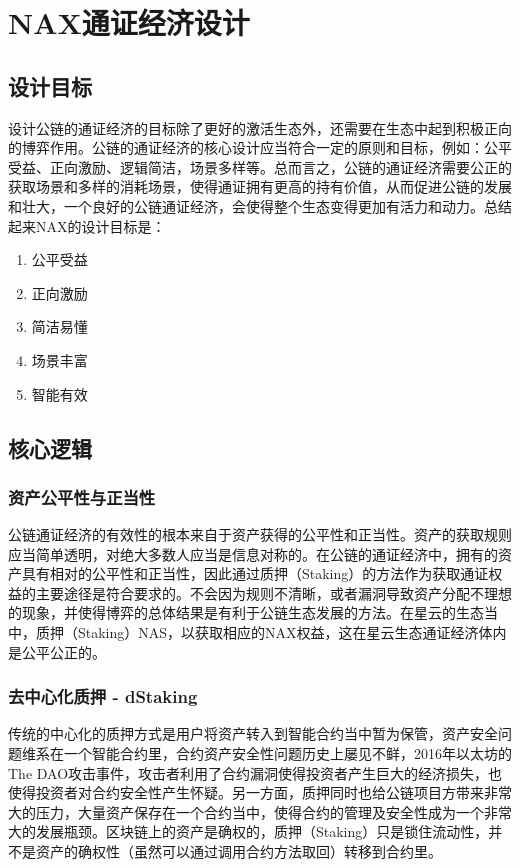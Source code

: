 \section{NAX通证经济设计}
\subsection{设计目标}
设计公链的通证经济的目标除了更好的激活生态外，还需要在生态中起到积极正向的博弈作用。公链的通证经济的核心设计应当符合一定的原则和目标，例如：公平受益、正向激励、逻辑简洁，场景多样等。总而言之，公链的通证经济需要公正的获取场景和多样的消耗场景，使得通证拥有更高的持有价值，从而促进公链的发展和壮大，一个良好的公链通证经济，会使得整个生态变得更加有活力和动力。总结起来NAX的设计目标是：

\begin{enumerate}[\hspace{2cm}(a)]
    \item 公平受益
    \item 正向激励
    \item 简洁易懂
    \item 场景丰富
    \item 智能有效
\end{enumerate}

\subsection{核心逻辑}

\subsubsection{资产公平性与正当性}
公链通证经济的有效性的根本来自于资产获得的公平性和正当性。资产的获取规则应当简单透明，对绝大多数人应当是信息对称的。在公链的通证经济中，拥有的资产具有相对的公平性和正当性，因此通过质押（Staking）的方法作为获取通证权益的主要途径是符合要求的。不会因为规则不清晰，或者漏洞导致资产分配不理想的现象，并使得博弈的总体结果是有利于公链生态发展的方法。在星云的生态当中，质押（Staking）NAS，以获取相应的NAX权益，这在星云生态通证经济体内是公平公正的。

\subsubsection{去中心化质押 - dStaking}
传统的中心化的质押方式是用户将资产转入到智能合约当中暂为保管，资产安全问题维系在一个智能合约里，合约资产安全性问题历史上屡见不鲜，2016年以太坊的The DAO攻击事件，攻击者利用了合约漏洞使得投资者产生巨大的经济损失，也使得投资者对合约安全性产生怀疑。另一方面，质押同时也给公链项目方带来非常大的压力，大量资产保存在一个合约当中，使得合约的管理及安全性成为一个非常大的发展瓶颈。区块链上的资产是确权的，质押（Staking）只是锁住流动性，并不是资产的确权性（虽然可以通过调用合约方法取回）转移到合约里。


